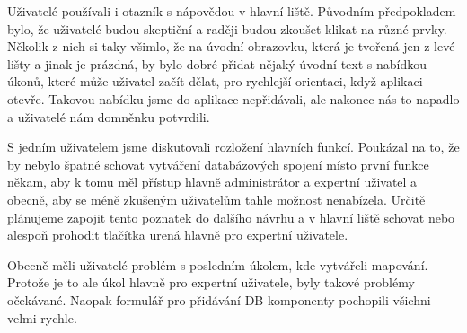 Uživatelé používali i otazník s nápovědou v hlavní liště. Původním předpokladem bylo, že uživatelé budou skeptiční a raději budou zkoušet klikat na různé prvky. Několik z nich si taky všimlo, že na úvodní obrazovku, která je tvořená jen z levé lišty a jinak je prázdná, by bylo dobré přidat nějaký úvodní text s nabídkou úkonů, které může uživatel začít dělat, pro rychlejší orientaci, když aplikaci otevře. Takovou nabídku jsme do aplikace nepřidávali, ale nakonec nás to napadlo a uživatelé nám domněnku potvrdili.

S jedním uživatelem jsme diskutovali rozložení hlavních funkcí. Poukázal na to, že by nebylo špatné schovat vytváření databázových spojení místo první funkce někam, aby k tomu měl přístup hlavně administrátor a expertní uživatel a obecně, aby se méně zkušeným uživatelům tahle možnost nenabízela. Určitě plánujeme zapojit tento poznatek do dalšího návrhu a v hlavní liště schovat nebo alespoň prohodit tlačítka urená hlavně pro expertní uživatele.

Obecně měli uživatelé problém s posledním úkolem, kde vytvářeli mapování. Protože je to ale úkol hlavně pro expertní uživatele, byly takové problémy očekávané. Naopak formulář pro přidávání DB komponenty pochopili všichni velmi rychle.
